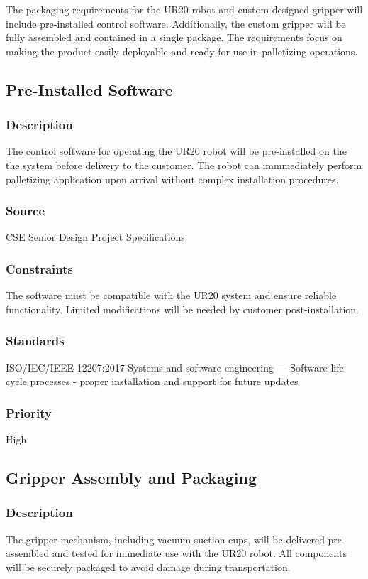 The packaging requirements for the UR20 robot and custom-designed gripper will include pre-installed control software. Additionally, the custom gripper will be fully assembled and contained in a single package. The requirements focus on making the product easily deployable and ready for use in palletizing operations.
\subsection{Pre-Installed Software}
\subsubsection{Description}
The control software for operating the UR20 robot will be pre-installed on the the system before delivery to the customer. The robot can immmediately perform palletizing application upon arrival without complex installation procedures. 
\subsubsection{Source}
CSE Senior Design Project Specifications
\subsubsection{Constraints}
The software must be compatible with the UR20 system and ensure reliable functionality. Limited modifications will be needed by customer post-installation.
\subsubsection{Standards}
ISO/IEC/IEEE 12207:2017 Systems and software engineering — Software life cycle processes - proper installation and support for future updates
\subsubsection{Priority}
High
\subsection{Gripper Assembly and Packaging}
\subsubsection{Description}
The gripper mechanism, including vacuum suction cups, will be delivered pre-assembled and tested for immediate use with the UR20 robot. All components will be securely packaged to avoid damage during transportation. 
